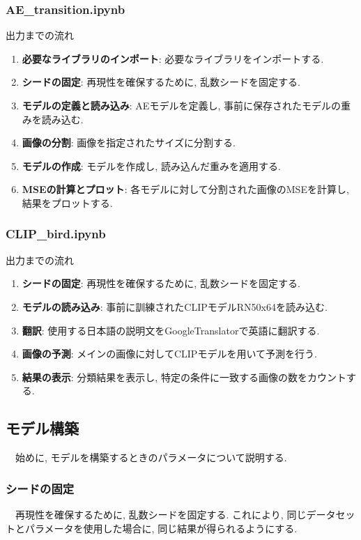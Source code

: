 \documentclass[a4paper, 12pt]{report}
\begin{document}
\subsubsection{\textbf{AE\_transition.ipynb}}

出力までの流れ
\begin{enumerate}
    \item \textbf{必要なライブラリのインポート}: 必要なライブラリをインポートする. 
    \item \textbf{シードの固定}: 再現性を確保するために, 乱数シードを固定する. 
    \item \textbf{モデルの定義と読み込み}: AEモデルを定義し, 事前に保存されたモデルの重みを読み込む. 
    \item \textbf{画像の分割}: 画像を指定されたサイズに分割する. 
    \item \textbf{モデルの作成}: モデルを作成し, 読み込んだ重みを適用する. 
    \item \textbf{MSEの計算とプロット}: 各モデルに対して分割された画像のMSEを計算し, 結果をプロットする. 
\end{enumerate}

\subsubsection{\textbf{CLIP\_bird.ipynb}}

出力までの流れ
\begin{enumerate}
    \item \textbf{シードの固定}: 再現性を確保するために, 乱数シードを固定する. 
    \item \textbf{モデルの読み込み}: 事前に訓練されたCLIPモデルRN50x64を読み込む. 
    \item \textbf{翻訳}: 使用する日本語の説明文をGoogleTranslatorで英語に翻訳する. 
    \item \textbf{画像の予測}: メインの画像に対してCLIPモデルを用いて予測を行う. 
    \item \textbf{結果の表示}: 分類結果を表示し, 特定の条件に一致する画像の数をカウントする. 
\end{enumerate}

\subsection{モデル構築}
　始めに, モデルを構築するときのパラメータについて説明する. 

\subsubsection{シードの固定}
　再現性を確保するために, 乱数シードを固定する. これにより, 同じデータセットとパラメータを使用した場合に, 同じ結果が得られるようにする. 
\end{document}
